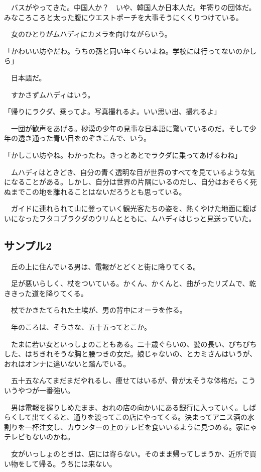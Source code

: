 \documentclass[11pt,a4paper,openright]{ltjsbook}
\begin{document}
　バスがやってきた。中国人か？　いや、韓国人か日本人だ。年寄りの団体だ。みなころころと太った腹にウエストポーチを大事そうにくくりつけている。

　女のひとりがムハディにカメラを向けながらいう。

「かわいい坊やだわ。うちの孫と同い年くらいよね。学校には行ってないのかしら」

　日本語だ。

　すかさずムハディはいう。

「帰りにラクダ、乗ってよ。写真撮れるよ。いい思い出、撮れるよ」

　一団が歓声をあげる。砂漠の少年の見事な日本語に驚いているのだ。そして少年の透き通った青い目をのぞきこんで、いう。

「かしこい坊やね。わかったわ。きっとあとでラクダに乗ってあげるわね」

　ムハディはときどき、自分の青く透明な目が世界のすべてを見ているような気になることがある。しかし、自分は世界の片隅にいるのだし、自分はおそらく死ぬまでこの地を離れることはないだろうとも思っている。

　ガイドに連れられて山に登っていく観光客たちの姿を、熱くやけた地面に腹ばいになったフタコブラクダのウリムとともに、ムハディはじっと見送っていた。

\subsection{サンプル2}

　丘の上に住んでいる男は、電報がとどくと街に降りてくる。

　足が悪いらしく、杖をついている。かくん、かくんと、曲がったリズムで、乾ききった道を降りてくる。

　杖でかきたてられた土埃が、男の背中にオーラを作る。

　年のころは、そうさな、五十五ってとこか。

　たまに若い女といっしょのこともある。二十歳ぐらいの、髪の長い、ぴちぴちした、はちきれそうな胸と腰つきの女だ。娘じゃないの、とカミさんはいうが、おれはオンナに違いないと踏んでいる。

　五十五なんてまだまだやれるし、痩せてはいるが、骨が太そうな体格だ。こういうやつが一番強い。

　男は電報を握りしめたまま、おれの店の向かいにある銀行に入っていく。しばらくして出てくると、通りを渡ってこの店にやってくる。決まってアニス酒の水割りを一杯注文し、カウンターの上のテレビを食いいるように見つめる。家にゃテレビもないのかね。

　女がいっしょのときは、店には寄らない。そのまま帰ってしまうか、近所で買い物をして帰る。うちには来ない。
\end{document}
